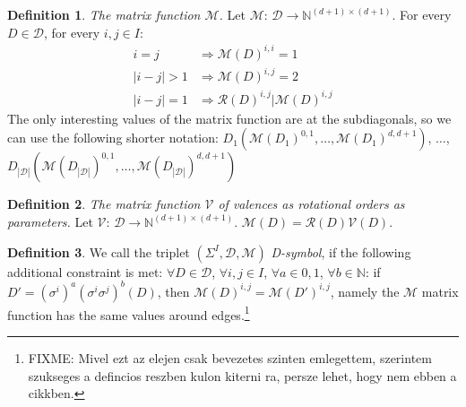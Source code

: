 \documentclass[12pt,a4paper]{article}
\theoremstyle{plain}%
\theoremstyle{definition}
\newtheorem{defn}{Definition}[section]
\theoremstyle{remark}
\begin{document}
\begin{defn}
  {\em The matrix function $\mathcal{M}$.}
  Let $\mathcal{M}$: $\mathcal{D} \rightarrow \mathbb{N}^{(d+1)\times (d+1)}$.
  For every $D\in\mathcal{D}$, for every $i,j\in I$:
  \begin{align}
    i=j & \Rightarrow \mathcal{M}(D)^{i,i}=1 \\
    |i-j|>1 & \Rightarrow \mathcal{M}(D)^{i,j}=2 \\
    |i-j|=1 & \Rightarrow \mathcal{R}(D)^{i,j}|\mathcal{M}(D)^{i,j}
  \end{align}
  The only interesting values of the matrix function are at the subdiagonals, so
  we can use the following shorter notation:
  $D_1(\mathcal{M}(D_1)^{0,1},\ldots,\mathcal{M}(D_1)^{d,d+1})$, $\ldots$,
  $D_{|\mathcal{D}|}(\mathcal{M}(D_{|\mathcal{D}|})^{0,1},\ldots,\mathcal{M}(D_{|\mathcal{D}|})^{d,d+1})$
\end{defn}

\begin{defn}
  {\em The matrix function $\mathcal{V}$ of valences as rotational orders
  as parameters.}
  Let $\mathcal{V}$: $\mathcal{D} \rightarrow \mathbb{N}^{(d+1)\times (d+1)}$.
  $\mathcal{M}(D)=\mathcal{R}(D)\mathcal{V}(D)$.
\end{defn}

\begin{defn}
  We call the triplet $(\Sigma^I,\mathcal{D},\mathcal{M})$ {\em D-symbol}, if the
  following additional constraint is met:
  $\forall D\in \mathcal{D}$, $\forall i,j\in I$, $\forall a\in {0,1}$,
      $\forall b\in \mathbb{N}$: if $D'=(\sigma^i)^a(\sigma^i\sigma^j)^b(D)$,
      then $\mathcal{M}(D)^{i,j}=\mathcal{M}(D')^{i,j}$, namely the
      $\mathcal{M}$ matrix function has the same values around edges.\footnote{FIXME:
      Mivel ezt az elejen csak bevezetes szinten emlegettem, szerintem szukseges
      a defincios reszben kulon kiterni ra, persze lehet, hogy nem ebben a
      cikkben.}
\end{defn}

\end{document}
